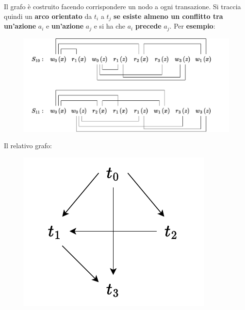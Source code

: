 \documentclass[a4paper]{article}
\begin{document}
	Il grafo è costruito facendo corrispondere un nodo a ogni transazione. Si traccia quindi un \textbf{arco orientato} da $t_{i}$ a $t_{j}$ \textbf{se esiste almeno un conflitto tra un'azione} $a_{i}$ e \textbf{un'azione} $a_{j}$ e si ha che $a_{i}$ \textbf{precede} $a_{j}$.\newline
	Per \textcolor{Green4}{\textbf{esempio}}:
	\begin{figure}[!htp]
		\centering
		\includegraphics[width=\textwidth]{img/conflict-equivalenza-grafo.pdf}
	\end{figure}\newpage

	\noindent
	Il relativo grafo:
	\begin{figure}[!htp]
		\centering
		\includegraphics[width=.4\textwidth]{img/conflict-equivalenza-grafo2.pdf}
	\end{figure}
\end{document}
